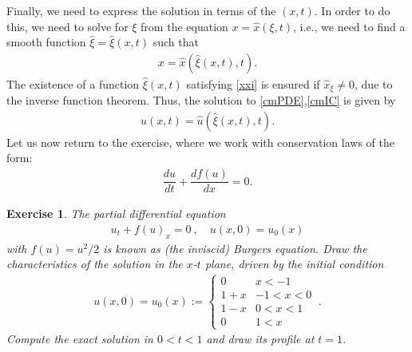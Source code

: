 \documentclass[10pt,letterpaper]{article}
\newcommand{\frb}[1]{ \left(  {#1} \right) }
\theoremstyle{break}
\newtheorem{exercise}{Exercise}
\begin{document}
\begin{solutioninformation}
	Finally, we need to express the solution in terms of the $(x,t)$. In order to do this, we need to solve for $\xi$ from the equation $x = \hat x\frb{\xi,t}$, i.e., we need to find a smooth function $\hat \xi=\hat \xi(x,t)$ such that
	\begin{gather} \label{xxi}
		x=\hat x\frb{\hat \xi(x,t),t}.
	\end{gather}
	The existence of a function $\hat \xi(x,t)$ satisfying \eqref{xxi} is ensured if $\hat x_\xi\ne0$, due to the inverse function theorem. Thus, the solution to \eqref{cmPDE},\eqref{cmIC} is given by
	\begin{gather} \label{cmSol}
		u(x,t)=\hat u\frb{\hat \xi(x,t) ,t}.
	\end{gather}
	Let us now return to the exercise, where we work with conservation laws of the form:
	\begin{gather} 
		\dfrac{du}{dt}+\dfrac{d f(u)}{dx}=0.
	\end{gather}
\end{solutioninformation}

\begin{exercise}
	The partial differential equation 
	\begin{gather}
		u_t+f(u)_x=0\ ,
		\quad
		u(x,0)=u_0(x)
	\end{gather}%
	with $f(u)=u^2/2$ is known as (the inviscid) Burgers equation. Draw the characteristics of the solution in the $x$-$t$ plane, driven by the initial condition
	\begin{gather} \label{inCond1}
		u(x,0)=
		u_0(x):=\begin{cases}
				0 	&   x< -1
				\\
				1+x & -1 < x<0
				\\
				1-x &  0 < x<1
				\\
				0 	&  1 < x
			\end{cases}\ .
	\end{gather}
	Compute the exact solution in $0<t<1$ and draw its profile at $t=1$.
\end{exercise}
\end{document}
